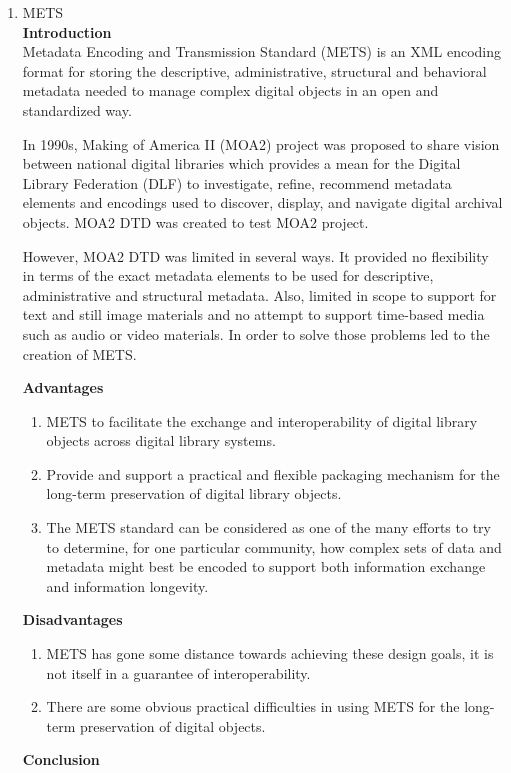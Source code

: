\begin{enumerate}
	\item METS\\
	{\bf Introduction}\\
	Metadata Encoding and Transmission Standard (METS) is an XML encoding format for storing the descriptive, administrative, structural and behavioral metadata needed to manage complex digital objects in an open and standardized way.
	
	In 1990s, Making of America II (MOA2) project was proposed to share vision between national digital libraries 
	which provides a mean for the Digital Library Federation (DLF) to investigate, refine, recommend metadata elements and encodings used to discover, display, and navigate digital archival objects.
	MOA2 DTD was created to test MOA2 project.
	
	However, MOA2 DTD was limited in several ways. 
	It provided no flexibility in terms of the exact metadata elements to be used for descriptive, administrative and structural metadata. 
	Also, limited in scope to support for text and still image materials and no attempt to support time-based media such as audio or video materials. 
	In order to solve those problems led to the creation of METS.
	
	{\bf Advantages}
	\begin{enumerate}
		\item METS to facilitate the exchange and interoperability of digital library objects across digital library systems.
		\item Provide and support a practical and flexible packaging mechanism for the long-term preservation of digital library objects.
		\item The METS standard can be considered as one of the many efforts to try to determine, for one particular community, how complex sets of data and metadata might best be encoded to support both information exchange and information longevity.
	\end{enumerate}	
	{\bf Disadvantages}
	\begin{enumerate}
		\item METS has gone some distance towards achieving these design goals, it is not itself in a guarantee of interoperability.
		\item There are some obvious practical difficulties in using METS for the long-term preservation of digital objects.
	\end{enumerate}
	{\bf Conclusion}\\	


\end{enumerate}
